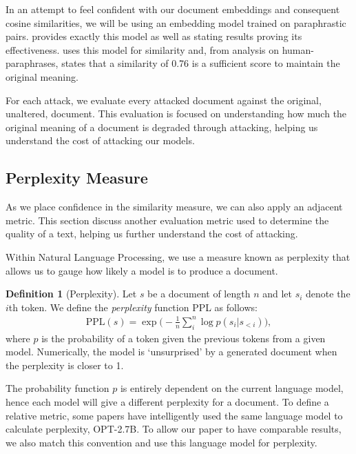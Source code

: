 \documentclass{l4proj}
\theoremstyle{definition}
\newtheorem{definition}{Definition}[section]
\newcommand{\codefont}[1]{{\fontfamily{lmtt}\selectfont #1}}
\begin{document}
        In an attempt to feel confident with our document embeddings and consequent cosine similarities, we will be using an embedding model trained on paraphrastic pairs. \citet{wieting2023paraphrastic} provides exactly this model as well as stating results proving its effectiveness. \citet{krishna2023paraphrasing} uses this model for similarity and, from analysis on human-paraphrases, states that a similarity of 0.76 is a sufficient score to maintain the original meaning.

        For each attack, we evaluate every attacked document against the original, unaltered, document. This evaluation is focused on understanding how much the original meaning of a document is degraded through attacking, helping us understand the cost of attacking our models.

    \subsection{Perplexity Measure}
        As we place confidence in the similarity measure, we can also apply an adjacent metric. This section discuss another evaluation metric used to determine the quality of a text, helping us further understand the cost of attacking.

        Within Natural Language Processing, we use a measure known as perplexity that allows us to gauge how likely a model is to produce a document.

        \begin{definition}[Perplexity]
            Let $s$ be a document of length $n$ and let $s_i$ denote the $i$th token. We define the \emph{perplexity} function PPL as follows:
            \begin{align*}
                \text{PPL}(s) = \exp\Bigg(-\frac{1}{n}\sum_i^n\log p(s_i | s_{<i})\Bigg),
            \end{align*}
            where $p$ is the probability of a token given the previous tokens from a given model. Numerically, the model is `unsurprised' by a generated document when the perplexity is closer to 1.
        \end{definition}

        The probability function $p$ is entirely dependent on the current language model, hence each model will give a different perplexity for a document. To define a relative metric, some papers \citep{kirchenbauer2023watermark, giboulot2024watermax, he2024watermarks} have intelligently used the same language model to calculate perplexity, \codefont{OPT-2.7B}. To allow our paper to have comparable results, we also match this convention and use this language model for perplexity. 
        
\end{document}
